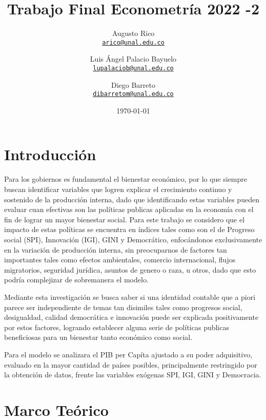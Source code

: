 \documentclass[11pt]{article}
\title{Trabajo Final Econometría 2022 -2}
\author{Augusto Rico\\%
    \href{mailto:arico@unal.edu.co}{\texttt{arico@unal.edu.co}} %
\and Luis Ángel Palacio Bayuelo\\%
    \href{mailto:lupalaciob@unal.edu.co}{\texttt{lupalaciob@unal.edu.co}} %
\and Diego Barreto\\%
    \href{mailto:dibarretom@unal.edu.co}{\texttt{dibarretom@unal.edu.co}}%
    }
\date{\today}
\begin{document}
{ %
\maketitle




\section{Introducción}

Para los gobiernos es fundamental el bienestar económico, por lo que siempre buscan identificar variables que logren explicar el crecimiento continuo y sostenido de la producción interna, dado que identificando estas variables pueden evaluar cuan efectivas son las políticas publicas aplicadas en la economía con el fin de lograr un mayor bienestar social. Para este trabajo se considero que el impacto de estas políticas se encuentra en índices tales como son el de Progreso social (SPI), Innovación (IGI), GINI y Democrático, enfocándonos exclusivamente en la variación de producción interna, sin preocuparnos de factores tan importantes tales como efectos ambientales, comercio internacional, flujos migratorios, seguridad jurídica, asuntos de genero o raza, u otros, dado que esto podría complejizar de sobremanera el modelo.

Mediante esta investigación se busca saber si una identidad contable que a piori parece ser independiente de temas tan disimiles tales como progresos social, desigualdad, calidad democrática e innovación puede ser explicada positivamente por estos factores, logrando establecer alguna serie de políticas publicas beneficiosas para un bienestar tanto económico como social.

Para el modelo se analizara el PIB per Capíta ajustado a su poder adquisitivo, evaluado en la mayor cantidad de países posibles, principalmente restringido por la obtención de datos, frente las variables exógenas SPI, IGI, GINI y Democracia.





\section{Marco Teórico}

}
\end{document}
